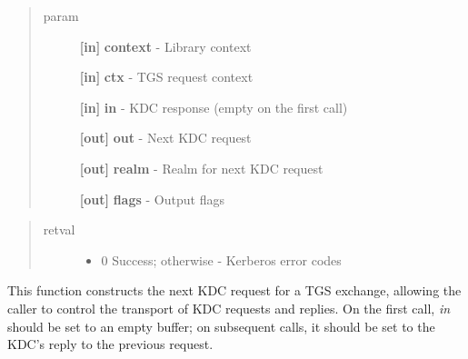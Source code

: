 \documentclass[letterpaper,10pt,english]{sphinxmanual}
\begin{document}
\begin{fulllineitems}
\label{appdev/refs/api/krb5_tkt_creds_step:c.krb5_tkt_creds_step}
\end{fulllineitems}

\begin{quote}\begin{description}
\item[{param}] \leavevmode
\textbf{{[}in{]}} \textbf{context} - Library context

\textbf{{[}in{]}} \textbf{ctx} - TGS request context

\textbf{{[}in{]}} \textbf{in} - KDC response (empty on the first call)

\textbf{{[}out{]}} \textbf{out} - Next KDC request

\textbf{{[}out{]}} \textbf{realm} - Realm for next KDC request

\textbf{{[}out{]}} \textbf{flags} - Output flags

\end{description}\end{quote}
\begin{quote}\begin{description}
\item[{retval}] \leavevmode\begin{itemize}
\item {} 
0   Success; otherwise - Kerberos error codes

\end{itemize}

\end{description}\end{quote}

This function constructs the next KDC request for a TGS exchange, allowing the caller to control the transport of KDC requests and replies. On the first call, \emph{in} should be set to an empty buffer; on subsequent calls, it should be set to the KDC's reply to the previous request.
\end{document}
